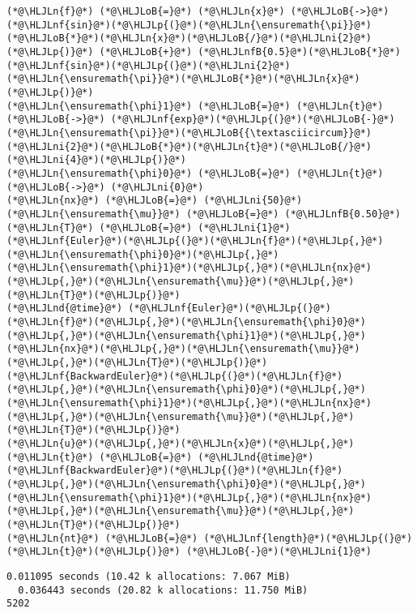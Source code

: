 \documentclass[12pt,landscape]{article}
\newcommand{\HLJLn}[1]{#1}
\newcommand{\HLJLnd}[1]{\textcolor[RGB]{214,102,97}{#1}}
\newcommand{\HLJLnf}[1]{\textcolor[RGB]{66,102,213}{#1}}
\newcommand{\HLJLnfB}[1]{\textcolor[RGB]{59,151,46}{#1}}
\newcommand{\HLJLni}[1]{\textcolor[RGB]{59,151,46}{#1}}
\newcommand{\HLJLoB}[1]{\textcolor[RGB]{102,102,102}{\textbf{#1}}}
\newcommand{\HLJLp}[1]{#1}
\begin{document}
{\begin{lstlisting}
(*@\HLJLn{f}@*) (*@\HLJLoB{=}@*) (*@\HLJLn{x}@*) (*@\HLJLoB{->}@*) (*@\HLJLnf{sin}@*)(*@\HLJLp{(}@*)(*@\HLJLn{\ensuremath{\pi}}@*)(*@\HLJLoB{*}@*)(*@\HLJLn{x}@*)(*@\HLJLoB{/}@*)(*@\HLJLni{2}@*)(*@\HLJLp{)}@*) (*@\HLJLoB{+}@*) (*@\HLJLnfB{0.5}@*)(*@\HLJLoB{*}@*)(*@\HLJLnf{sin}@*)(*@\HLJLp{(}@*)(*@\HLJLni{2}@*)(*@\HLJLn{\ensuremath{\pi}}@*)(*@\HLJLoB{*}@*)(*@\HLJLn{x}@*)(*@\HLJLp{)}@*)
(*@\HLJLn{\ensuremath{\phi}1}@*) (*@\HLJLoB{=}@*) (*@\HLJLn{t}@*) (*@\HLJLoB{->}@*) (*@\HLJLnf{exp}@*)(*@\HLJLp{(}@*)(*@\HLJLoB{-}@*)(*@\HLJLn{\ensuremath{\pi}}@*)(*@\HLJLoB{{\textasciicircum}}@*)(*@\HLJLni{2}@*)(*@\HLJLoB{*}@*)(*@\HLJLn{t}@*)(*@\HLJLoB{/}@*)(*@\HLJLni{4}@*)(*@\HLJLp{)}@*)
(*@\HLJLn{\ensuremath{\phi}0}@*) (*@\HLJLoB{=}@*) (*@\HLJLn{t}@*) (*@\HLJLoB{->}@*) (*@\HLJLni{0}@*)
(*@\HLJLn{nx}@*) (*@\HLJLoB{=}@*) (*@\HLJLni{50}@*)
(*@\HLJLn{\ensuremath{\mu}}@*) (*@\HLJLoB{=}@*) (*@\HLJLnfB{0.50}@*)
(*@\HLJLn{T}@*) (*@\HLJLoB{=}@*) (*@\HLJLni{1}@*)
(*@\HLJLnf{Euler}@*)(*@\HLJLp{(}@*)(*@\HLJLn{f}@*)(*@\HLJLp{,}@*)(*@\HLJLn{\ensuremath{\phi}0}@*)(*@\HLJLp{,}@*)(*@\HLJLn{\ensuremath{\phi}1}@*)(*@\HLJLp{,}@*)(*@\HLJLn{nx}@*)(*@\HLJLp{,}@*)(*@\HLJLn{\ensuremath{\mu}}@*)(*@\HLJLp{,}@*)(*@\HLJLn{T}@*)(*@\HLJLp{)}@*)
(*@\HLJLnd{@time}@*) (*@\HLJLnf{Euler}@*)(*@\HLJLp{(}@*)(*@\HLJLn{f}@*)(*@\HLJLp{,}@*)(*@\HLJLn{\ensuremath{\phi}0}@*)(*@\HLJLp{,}@*)(*@\HLJLn{\ensuremath{\phi}1}@*)(*@\HLJLp{,}@*)(*@\HLJLn{nx}@*)(*@\HLJLp{,}@*)(*@\HLJLn{\ensuremath{\mu}}@*)(*@\HLJLp{,}@*)(*@\HLJLn{T}@*)(*@\HLJLp{)}@*)
(*@\HLJLnf{BackwardEuler}@*)(*@\HLJLp{(}@*)(*@\HLJLn{f}@*)(*@\HLJLp{,}@*)(*@\HLJLn{\ensuremath{\phi}0}@*)(*@\HLJLp{,}@*)(*@\HLJLn{\ensuremath{\phi}1}@*)(*@\HLJLp{,}@*)(*@\HLJLn{nx}@*)(*@\HLJLp{,}@*)(*@\HLJLn{\ensuremath{\mu}}@*)(*@\HLJLp{,}@*)(*@\HLJLn{T}@*)(*@\HLJLp{)}@*)
(*@\HLJLn{u}@*)(*@\HLJLp{,}@*)(*@\HLJLn{x}@*)(*@\HLJLp{,}@*)(*@\HLJLn{t}@*) (*@\HLJLoB{=}@*) (*@\HLJLnd{@time}@*) (*@\HLJLnf{BackwardEuler}@*)(*@\HLJLp{(}@*)(*@\HLJLn{f}@*)(*@\HLJLp{,}@*)(*@\HLJLn{\ensuremath{\phi}0}@*)(*@\HLJLp{,}@*)(*@\HLJLn{\ensuremath{\phi}1}@*)(*@\HLJLp{,}@*)(*@\HLJLn{nx}@*)(*@\HLJLp{,}@*)(*@\HLJLn{\ensuremath{\mu}}@*)(*@\HLJLp{,}@*)(*@\HLJLn{T}@*)(*@\HLJLp{)}@*)
(*@\HLJLn{nt}@*) (*@\HLJLoB{=}@*) (*@\HLJLnf{length}@*)(*@\HLJLp{(}@*)(*@\HLJLn{t}@*)(*@\HLJLp{)}@*) (*@\HLJLoB{-}@*)(*@\HLJLni{1}@*)
\end{lstlisting}

\begin{lstlisting}
0.011095 seconds (10.42 k allocations: 7.067 MiB)
  0.036443 seconds (20.82 k allocations: 11.750 MiB)
5202
\end{lstlisting}


}
\end{document}
